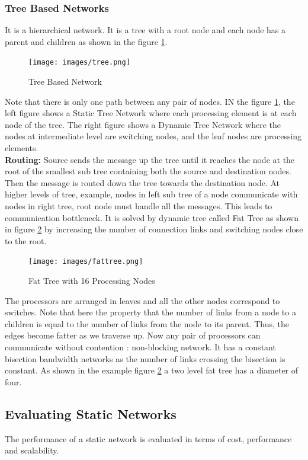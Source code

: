 \documentclass[12pt]{article}
\begin{document}
\subsubsection{Tree Based Networks}
It is a hierarchical network. It is a tree with a root node and each node has a parent and children
as shown in the figure \ref{fig:tree}.
\begin{figure}[H]
    \centering
    \texttt{[image: images/tree.png]}
    \caption{Tree Based Network}
    \label{fig:tree}
\end{figure}
Note that there is only one path between any pair of nodes.
IN the figure \ref{fig:tree}, the left figure shows a Static Tree Network where each processing element is at 
each node of the tree. The right figure shows a Dynamic Tree Network where the nodes at intermediate level
are switching nodes, and the leaf nodes are processing elements.\\
\textbf{Routing: }Source sends the message up the tree until it reaches the node at the root of the smallest sub tree containing both the 
source and destination nodes. Then the message is routed down the tree towards the destination node.
At higher levels of tree, example, nodes in left sub tree of a node communicate with nodes in right tree, root node must handle all the messages. This leads to
communication bottleneck. It is solved by dynamic tree called Fat Tree as shown in figure \ref{fig:fattree} by increasing the number of connection links and switching nodes close to the root.
\begin{figure}[H]
    \centering
    \texttt{[image: images/fattree.png]}
    \caption{Fat Tree with 16 Processing Nodes}
    \label{fig:fattree}
\end{figure}
The processors are arranged in leaves and all the other nodes correspond to switches. Note that here the property that 
the number of links from a node to a children is equal to the number of links from the node to its parent. Thus, the edges become fatter as we traverse up.
Now any pair of processors can communicate without contention : non-blocking network. It has a constant bisection bandwidth networks as 
the number of links crossing the bisection is constant. As shown in the example figure \ref{fig:fattree} a two level fat tree has a diameter of four.
\subsection{Evaluating Static Networks}
The performance of a static network is evaluated in terms of cost, performance and scalability.
\end{document}
